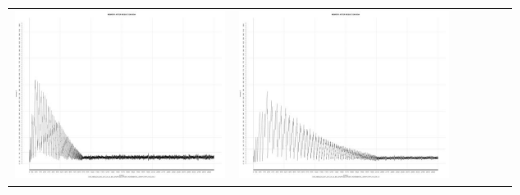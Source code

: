 \begin{table}[htbp]
{\begin{tabular}{l | ccccc}
\begin{minipage}{.15\textwidth}
     			 	\includegraphics[width=\linewidth]{images/mema-graph/I3}
    				 \end{minipage}
    			   & \begin{minipage}{.15\textwidth}
     			 	\includegraphics[width=\linewidth]{images/mema-graph/I7}
    				 \end{minipage}
    			   &	 \begin{minipage}{.15\textwidth}

\end{minipage}
\end{tabular}}
\end{table}
